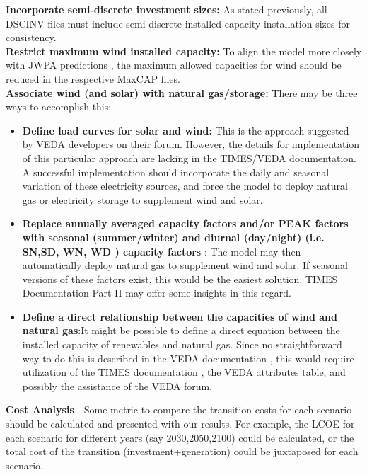 \documentclass[14pt,a4paper]{article} %
\begin{document}
\textbf{Incorporate semi-discrete investment sizes:} As stated previously, all \gls{DSCINV} files must include semi-discrete installed  capacity installation sizes for consistency.\\

\textbf{Restrict maximum wind installed  capacity:} To align the model more closely with JWPA predictions \cite{heger_wind_2016}, the maximum allowed capacities for wind should be reduced in the respective \gls{MaxCAP} files.\\

\textbf{Associate wind (and solar) with natural gas/storage:} There may be three ways to accomplish this:

\begin{itemize}

\item \textbf{Define load curves for solar and wind:} This is the approach suggested by VEDA developers on their forum. However, the details for implementation of this particular approach are lacking in the \gls{TIMES}/VEDA documentation. A successful implementation should incorporate the daily and seasonal variation of these electricity sources, and force the model to deploy natural gas or electricity storage to supplement wind and solar.

\item \textbf{Replace annually averaged  capacity factors and/or \gls{PEAK} factors with seasonal (summer/winter) and diurnal (day/night) (i.e. SN,SD, WN, WD \cite{gargiulo_documentation_2005}) capacity factors} : The model may then automatically deploy natural gas to supplement wind and solar. If seasonal versions of these factors exist, this would be the easiest solution. \gls{TIMES} Documentation Part II \cite{loulou_documentation_2005} may offer some insights in this regard.

\item \textbf{Define a direct relationship between the capacities of wind and natural gas}:It might be possible to define a direct equation between the installed  capacity of renewables and natural gas. Since no straightforward way to do this is described in the VEDA documentation \cite{gargiulo_documentation_2005}, this would require utilization of the \gls{TIMES} documentation \cite{loulou_documentation_2005}, the VEDA attributes table, and  possibly the assistance of the VEDA forum.

\end{itemize}

\textbf{Cost Analysis} - Some metric to compare the transition costs for each scenario should be calculated and presented with our results. For example, the \gls{LCOE} for each scenario for different years (say 2030,2050,2100) could be calculated, or the total cost of the transition (investment+generation) could be juxtaposed for each scenario.\\
\end{document}
